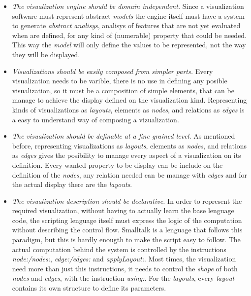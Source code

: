\documentclass{sig-alternate}
\begin{document}
\begin{itemize}
\item \emph{The visualization engine should be domain independent.}
Since a visualization software must represent abstract \emph{models}
the engine itself must have a system to generate \emph{abstract analisys},
analisys of features that are not yet evaluated when are defined, 
for any kind of (numerable) property that could be needed. This way
the \emph{model} will only define the values to be represented, not
the way they will be displayed.

\item \emph{Visualizations should be easily composed from simpler parts.}
Every visualization needs to be varible, there is no use in  defining
any posible visualization, so it must be a composition of simple elements,
that can be manage to achieve the display defined on the visualization kind.
Representing kinds of visualizations as \emph{layouts}, elements as \emph{nodes},
and relations as \emph{edges} is a easy to understand way of composing a
vizualization.
 
\item \emph{The visualization should be definable at a fine grained level.}
As mentioned before, representing visualizations as \emph{layouts}, elements as 
\emph{nodes}, and relations as \emph{edges} gives the posibility to 
manage every aspect of a visualization on its definition. Every wanted
property to be display can be include on the definition of the \emph{nodes},
any relation needed can be manage with \emph{edges} and for the actual display
there are the \emph{layouts}.

\item \emph{The visualization description should be declarative.}
In order to represent the required visualization, without having to 
actually learn the base lenguage code, the scripting lenguage itself
must express the logic of the computation without describing the control 
flow. Smalltalk is a lenguage that follows this paradigm, but this is
hardly enougth to make the script easy to follow. The actual computation
behind the system is controlled by the instructions \emph{node:/nodes:}, 
\emph{edge:/edges:} and \emph{applyLayout:}. Most times, the visualization
need more than just this instructions, it needs to control the \emph{shape}
of both \emph{nodes} and \emph{edges}, with the instruction \emph{using:}. 
For the \emph{layouts}, every \emph{layout} contains its own structure to 
define its parameters.   
\end{itemize}
\end{document}
